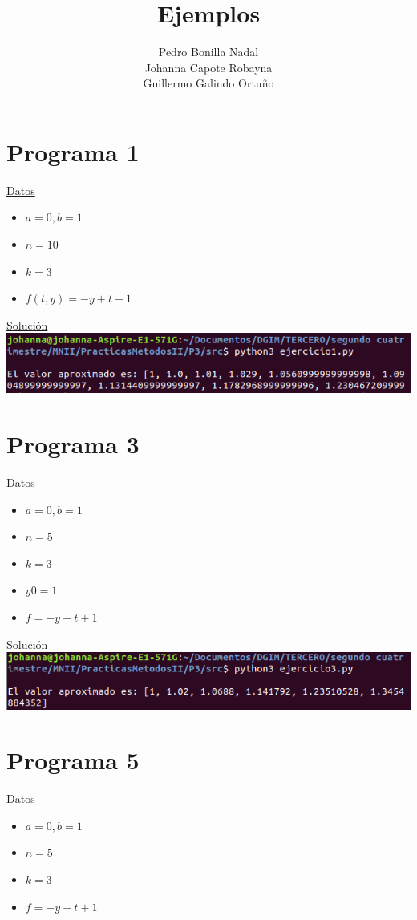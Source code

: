 \documentclass[11pt]{article}
\title{\textbf{Ejemplos}}
\author{Pedro Bonilla Nadal\\
		Johanna Capote Robayna\\
		Guillermo Galindo Ortuño}
\date{}
\begin{document}
\maketitle
\section*{Programa 1} 
\underline{Datos} 
\begin{itemize}

\item $a = 0, b=1$
\item $ n = 10$
\item $k = 3 $
\item $f(t,y) = -y + t +1$ 

\end{itemize}

\underline{Solución} \\
\includegraphics[width=1.1\textwidth]{../img/ej1} \\
\section*{Programa 3}
\underline{Datos}
\begin{itemize}
 
\item $a = 0, b=1$
\item $ n = 5$
\item $k = 3$
\item $ y0 = 1$
\item $f = -y+t+1$
\end{itemize}

\underline{Solución} \\
\includegraphics[width=1.1\textwidth]{../img/ej3}


\section*{Programa 5}
\underline{Datos}
\begin{itemize}

\item $a = 0, b=1$
\item $ n = 5$
\item $ k = 3$
\item $f = -y+t+1$ 
\end{itemize}
\end{document}
